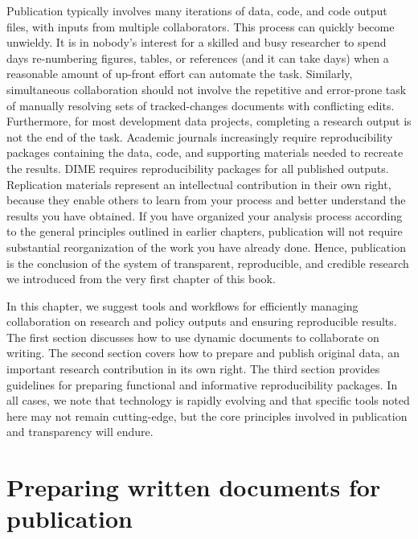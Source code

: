 
\begin{fullwidth}
Publication typically involves many iterations of
data, code, and code output files, with inputs from multiple collaborators.
This process can quickly become unwieldy.
It is in nobody's interest for a skilled and busy researcher
to spend days re-numbering figures, tables, or references (and it can take days)
when a reasonable amount of up-front effort can automate the task.
Similarly, simultaneous collaboration should not involve
the repetitive and error-prone task of manually resolving
sets of tracked-changes documents with conflicting edits.
Furthermore, for most development data projects,
completing a research output is not the end of the task.
Academic journals increasingly require reproducibility packages
containing the data, code, and supporting materials
needed to recreate the results.
DIME requires reproducibility packages for all published outputs.
Replication materials represent an intellectual contribution in their own right,
because they enable others to learn from your process
and better understand the results you have obtained.
If you have organized your analysis process
according to the general principles outlined in earlier chapters,
publication will not require
substantial reorganization of the work you have already done.
Hence, publication is the conclusion of the system
of transparent, reproducible, and credible research we introduced
from the very first chapter of this book.

In this chapter, we suggest tools and workflows for
efficiently managing collaboration on research and policy outputs
and ensuring reproducible results.
The first section discusses how to use dynamic documents to collaborate on writing.
The second section covers how to prepare and publish original data,
an important research contribution in its own right.
The third section provides guidelines for preparing
functional and informative reproducibility packages.
In all cases, we note that technology is rapidly evolving
and that specific tools noted here may not remain cutting-edge,
but the core principles involved in publication and transparency will endure.
\end{fullwidth}


\section{Preparing written documents for publication}


